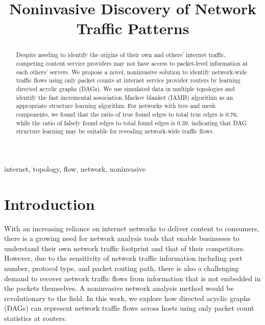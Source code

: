 \documentclass[conference]{IEEEtran}
\begin{document}
\title{Noninvasive Discovery of Network Traffic Patterns\\
}
\author{
\and
{}
}
\maketitle
\begin{abstract}
Despite needing to identify the origins of their own and others' internet traffic, competing content service providers may not have access to packet-level information at each others' servers. We propose a novel, noninvasive solution to identify network-wide traffic flows using only packet counts at internet service provider routers by learning directed acyclic graphs (DAGs). We use simulated data in multiple topologies and identify the fast incremental association Markov blanket (IAMB) algorithm as an appropriate structure learning algorithm. For networks with tree and mesh components, we found that the ratio of true found edges to total true edges is 0.76, while the ratio of falsely found edges to total found edges is 0.39, indicating that DAG structure learning may be suitable for revealing network-wide traffic flows.

\end{abstract}

\begin{IEEEkeywords}
internet, topology, flow, network, noninvasive
\end{IEEEkeywords}

\section{Introduction}
With an increasing reliance on internet networks to deliver content to consumers, there is a growing need for network analysis tools that enable businesses to understand their own network traffic footprint and that of their competitors. However, due to the sensitivity of network traffic information including port number, protocol type, and packet routing path, there is also a challenging demand to recover network traffic flows from information that is not embedded in the packets themselves.  A noninvasive network analysis method would be revolutionary to the field. In this work, we explore how directed acyclic graphs (DAGs) can represent network traffic flows across hosts using only packet count statistics at routers.
\end{document}
